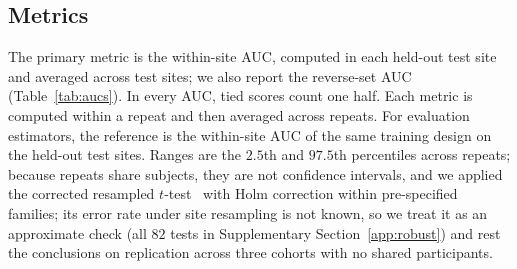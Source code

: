 \subsection{Metrics}\label{sec:metrics}

The primary metric is the within-site AUC, computed in each held-out test site and averaged across test sites; we also report the reverse-set AUC (Table~\ref{tab:aucs}). In every AUC, tied scores count one half. Each metric is computed within a repeat and then averaged across repeats. For evaluation estimators, the reference is the within-site AUC of the same training design on the held-out test sites. Ranges are the $2.5$th and $97.5$th percentiles across repeats; because repeats share subjects, they are not confidence intervals, and we applied the corrected resampled $t$-test~\cite{nadeau2003} with Holm correction within pre-specified families; its error rate under site resampling is not known, so we treat it as an approximate check (all $82$ tests in Supplementary Section~\ref{app:robust}) and rest the conclusions on replication across three cohorts with no shared participants.
